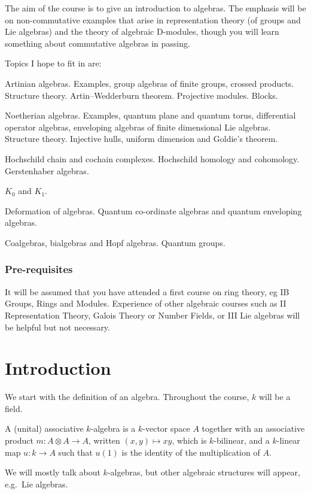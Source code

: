 \documentclass[a4paper]{article}
\begin{document}
\maketitle
{\small
\setlength{\parindent}{0em}
\setlength{\parskip}{1em}
The aim of the course is to give an introduction to algebras. The emphasis will be on non-commutative examples that arise in representation theory (of groups and Lie algebras) and the theory of algebraic D-modules, though you will learn something about commutative algebras in passing.

Topics I hope to fit in are:

Artinian algebras. Examples, group algebras of finite groups, crossed products. Structure theory. Artin--Wedderburn theorem. Projective modules. Blocks.

Noetherian algebras. Examples, quantum plane and quantum torus, differential operator algebras, enveloping algebras of finite dimensional Lie algebras. Structure theory. Injective hulls, uniform dimension and Goldie's theorem.

Hochschild chain and cochain complexes. Hochschild homology and cohomology. Gerstenhaber algebras.

$K_0$ and $K_1$.

Deformation of algebras. Quantum co-ordinate algebras and quantum enveloping algebras.

Coalgebras, bialgebras and Hopf algebras. Quantum groups.

\subsubsection*{Pre-requisites}
It will be assumed that you have attended a first course on ring theory, eg IB Groups, Rings and Modules. Experience of other algebraic courses such as II Representation Theory, Galois Theory or Number Fields, or III Lie algebras will be helpful but not necessary.
}
\tableofcontents

\setcounter{section}{-1}
\section{Introduction}
We start with the definition of an algebra. Throughout the course, $k$ will be a field.
\begin{defi}[$k$-algebra]
  A (unital) associative $k$-algebra is a $k$-vector space $A$ together with an associative product $m: A \otimes A \to A$, written $(x, y) \mapsto xy$, which is $k$-bilinear, and a $k$-linear map $u: k \to A$ such that $u(1)$ is the identity of the multiplication of $A$.
\end{defi}
We will mostly talk about $k$-algebras, but other algebraic structures will appear, e.g.\ Lie algebras.
\end{document}
